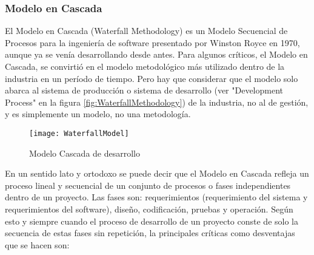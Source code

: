 \subsubsection{Modelo en Cascada}

El Modelo en Cascada (Waterfall Methodology) \cite{Ken-Schwaber-1995} es un Modelo Secuencial de Procesos para la ingeniería de software presentado por Winston Royce en 1970, aunque ya se venía desarrollando desde antes. Para algunos críticos, el Modelo en Cascada, se convirtió en el modelo metodológico más utilizado dentro de la industria en un período de tiempo. Pero hay que considerar que el modelo solo abarca al sistema de producción o sistema de desarrollo (ver "Development Process" en la figura \ref{fig:WaterfallMethodology}) de la industria, no al de gestión, y es simplemente un modelo, no una metodología.

\begin{figure}[h]
  \centering
  \texttt{[image: WaterfallModel]}
  \caption{Modelo Cascada de desarrollo}
  \centering
  \label{fig:WaterfallModel} %
\end{figure}

En un sentido lato y ortodoxo se puede decir que el Modelo en Cascada refleja un proceso lineal y secuencial de un conjunto de procesos o fases independientes dentro de un proyecto. Las fases son: requerimientos (requerimiento del sistema y requerimientos del software), diseño, codificación, pruebas y operación. Según esto y siempre cuando el proceso de desarrollo de un proyecto conste de solo la secuencia de estas fases sin repetición, la principales críticas como desventajas que se hacen son:

